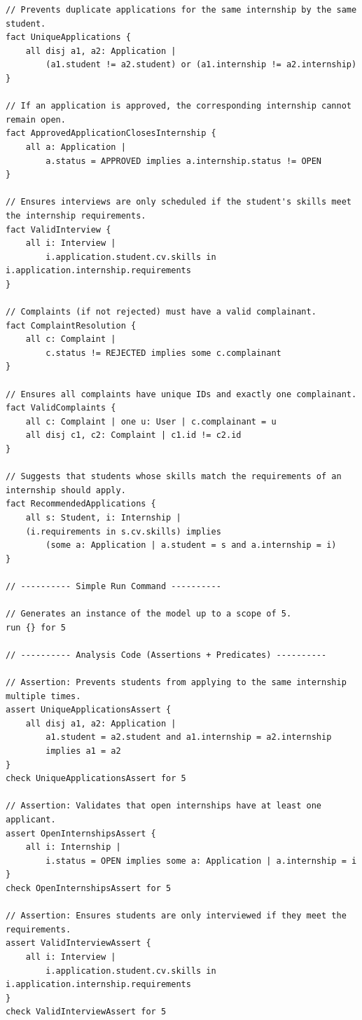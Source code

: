 \begin{lstlisting}
// Prevents duplicate applications for the same internship by the same student.
fact UniqueApplications {
	all disj a1, a2: Application |
    	(a1.student != a2.student) or (a1.internship != a2.internship)
}

// If an application is approved, the corresponding internship cannot remain open.
fact ApprovedApplicationClosesInternship {
	all a: Application |
    	a.status = APPROVED implies a.internship.status != OPEN
}

// Ensures interviews are only scheduled if the student's skills meet the internship requirements.
fact ValidInterview {
	all i: Interview |
    	i.application.student.cv.skills in i.application.internship.requirements
}

// Complaints (if not rejected) must have a valid complainant.
fact ComplaintResolution {
	all c: Complaint |
    	c.status != REJECTED implies some c.complainant
}

// Ensures all complaints have unique IDs and exactly one complainant.
fact ValidComplaints {
	all c: Complaint | one u: User | c.complainant = u
	all disj c1, c2: Complaint | c1.id != c2.id
}

// Suggests that students whose skills match the requirements of an internship should apply.
fact RecommendedApplications {
	all s: Student, i: Internship |
  	(i.requirements in s.cv.skills) implies
    	(some a: Application | a.student = s and a.internship = i)
}

// ---------- Simple Run Command ----------

// Generates an instance of the model up to a scope of 5.
run {} for 5

// ---------- Analysis Code (Assertions + Predicates) ----------

// Assertion: Prevents students from applying to the same internship multiple times.
assert UniqueApplicationsAssert {
	all disj a1, a2: Application |
    	a1.student = a2.student and a1.internship = a2.internship
    	implies a1 = a2
}
check UniqueApplicationsAssert for 5

// Assertion: Validates that open internships have at least one applicant.
assert OpenInternshipsAssert {
	all i: Internship |
    	i.status = OPEN implies some a: Application | a.internship = i
}
check OpenInternshipsAssert for 5

// Assertion: Ensures students are only interviewed if they meet the requirements.
assert ValidInterviewAssert {
	all i: Interview |
    	i.application.student.cv.skills in i.application.internship.requirements
}
check ValidInterviewAssert for 5


\end{lstlisting}
